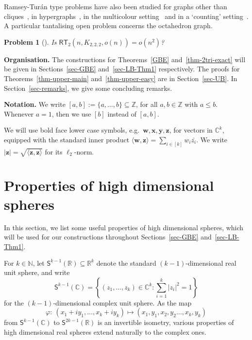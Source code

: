 \documentclass[10pt,a4paper]{article}
\newcommand\innerp[1]{\langle #1 \rangle}
\newcommand{\V}[1]{\mathbold{#1}}
\newtheorem{probx}[conjx]{Problem}
\theoremstyle{definition}
\newcommand{\sS}{\mathsf{S}}
\newcommand{\sN}{\mathbb{N}}
\newcommand{\sC}{\mathbb{C}}
\newcommand{\sR}{\mathbb{R}}
\newcommand{\rt}{{\mathsf{RT}}}
\begin{document}
Ramsey-Tur\'an type problems have also been studied for graphs other than cliques~\cite{BMSh,EHSSz,NP,Sudakov}, in hypergraphs~\cite{BL-1,ES2,FranklRodl,MubayiRodl,MubayiSos,Sidorenko}, in the multicolour setting~\cite{EHSSSz2,KKL,LNS,Schelp} and in a `counting' setting~\cite{BLSh}.
A particular tantalising open problem concerns the octahedron graph.

\begin{probx}[\cite{EHSSSz2,EHSSz,SimSos,Sudakov}]
Is $\rt_2(n,K_{2,2,2},o(n))=o(n^2)$?
\end{probx}

\medskip

\noindent
\textbf{Organisation.} The constructions for Theorems~\ref{GBE} and~\ref{thm-2tri-exact} will be given in Sections~\ref{sec-GBE} and~\ref{sec-LB-Thm1} respectively. The proofs for Theorems~\ref{thm-upper-main} and~\ref{thm-upper-easy} are in Section~\ref{sec-UB}. In Section~\ref{sec-remarks}, we give some concluding remarks.

\medskip

\noindent
\textbf{Notation.} We write $[a,b]:=\{a,\ldots,b\}\subseteq \mathbb{Z}$, for all $a,b\in \mathbb{Z}$ with $a\le b$. Whenever $a=1$, then we use $[b]$ instead of $[a,b]$. 

We will use bold face lower case symbols, e.g.~$\V{w}, \V{x}, \V{y}, \V{z}$, for vectors in $\sC^{k}$, equipped with the standard inner product $\innerp{\V{w},\V{z}}=\sum_{i\in [k]}w_i\bar{z_i}$. We write $|\V{z}|=\sqrt{\innerp{\V{z},\V{z}}}$ for its $\ell_2$-norm.

\section{Properties of high dimensional spheres}\label{sec-propertiesHDS}
In this section, we list some useful properties of high dimensional spheres, which will be used for our constructions throughout Sections~\ref{sec-GBE} and~\ref{sec-LB-Thm1}.

For $k\in\sN$, let $\sS^{k-1}(\sR)\subseteq \sR^{k}$ denote the standard $(k-1)$-dimensional real unit sphere, and write
$$\sS^{k-1}(\sC)=\left\{(z_1,\ldots, z_{k})\in\sC^{k}: \sum_{i=1}^{k}|z_i|^2=1\right\}$$
for the $(k-1)$-dimensional complex unit sphere.  As the map
\begin{equation}\label{eq: isom}
	\varphi:~ (x_1+iy_1,\ldots, x_k+iy_k)\longmapsto (x_1,y_1,x_2,y_2\ldots,x_k,y_k)
\end{equation}
from $\sS^{k-1}(\sC)$ to $\sS^{2k-1}(\sR)$ is an invertible isometry, various properties of high dimensional real spheres extend naturally to the complex ones.
\end{document}
